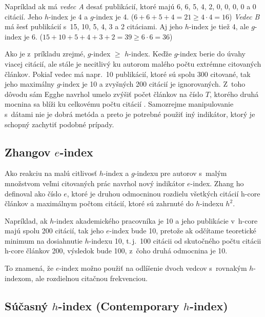 Napríklad ak má \emph{vedec A} desať publikácií, ktoré majú 6, 6, 5, 4, 2, 0, 0,
0, 0 a 0 citácií.  Jeho $h$-index je 4 a $g$-index je 4.
($6+6+5+4 = 21 \geq 4\cdot4=16$) \emph{Vedec B} má šesť publikácií s~15, 10, 5,
4, 3 a 2 citáciami.  Aj jeho $h$-index je tiež 4, ale $g$-index je 6.
($15+10+5+4+3+2 = 39 \geq 6\cdot6 = 36$)

Ako je z~príkladu zrejmé, $g$-index $\geq$ $h$-index.  Keďže $g$-index berie do
úvahy viacej citácií, ale stále je necitlivý ku autorom malého počtu extrémne
citovaných článkov.  Pokiaľ vedec má napr.~10 publikácií, ktoré sú spolu 300
citované, tak jeho maximálny $g$-index je 10 a zvyšných 200 citácií je
ignorovaných.  Z~toho dôvodu sám Egghe navrhol umelo zvýšiť počet článkov na
číslo $T$, ktorého druhá mocnina sa blíži ku celkovému počtu citácií
\citep{Egghe2006}.  Samozrejme manipulovanie s~dátami nie je dobrá metóda a
preto je potrebné použiť iný indikátor, ktorý je schopný zachytiť podobné
prípady.


\subsection{Zhangov $e$-index}
\label{sec:e-index}

Ako reakciu na malú citlivosť $h$-index a $g$-indexu pre autorov s~malým
množstvom veľmi citovaných prác \citet{Zhang2009} navrhol nový indikátor
$e$-index.  Zhang ho definoval ako číslo $e$, ktoré je druhou odmocninou
rozdielu všetkých citácií h-core článkov a maximálnym počtom citácií, ktoré sú
zahrnuté do $h$-indexu $h^2$.

Napríklad, ak $h$-index akademického pracovníka je 10 a jeho publikácie v~h-core
majú spolu 200 citácií, tak jeho $e$-index bude 10, pretože ak odčítame
teoretické minimum na dosiahnutie $h$-indexu 10, t.\,j.~100 citácii od
skutočného počtu citácii h-core článkov 200, výsledok bude 100, z~čoho druhá
odmocnina je 10.

To znamená, že $e$-index možno použiť na odlíšenie dvoch vedcov s~rovnakým
$h$-indexom, ale rozdielnou citačnou frekvenciou.


\subsection{Súčasný $h$-index (Contemporary $h$-index)}
\label{sec:hc-index}

